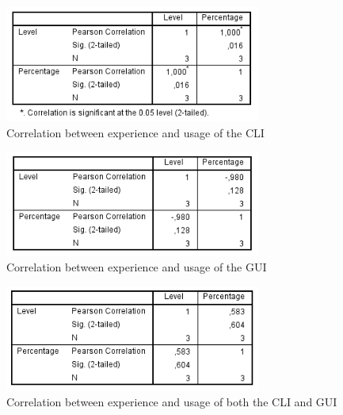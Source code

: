 \documentclass[a4paper,oneside]{bth} %
\begin{document}
				\begin{figure}[H]
					\centering
					\includegraphics[width=0.75\textwidth]{graphs/correlation-between-knowledge-and-usage-of-cli.png}
					\caption{Correlation between experience and usage of the CLI}
					\label{fig:Correlation between experience and usage of the CLI.}
				\end{figure}
				
				\begin{figure}[H]
					\centering
					\includegraphics[width=0.75\textwidth]{graphs/correlation-between-knowledge-and-usage-of-gui.png}
					\caption{Correlation between experience and usage of the GUI}
					\label{fig:Correlation between experience and usage of the GUI.}
				\end{figure}
				
				\begin{figure}[H]
					\centering
					\includegraphics[width=0.75\textwidth]{graphs/correlation-between-knowledge-and-usage-of-both.png}
					\caption{Correlation between experience and usage of both the CLI and GUI}
					\label{fig:Correlation between experience and usage of both the CLI and GUI.}
				\end{figure}
				
\end{document}
